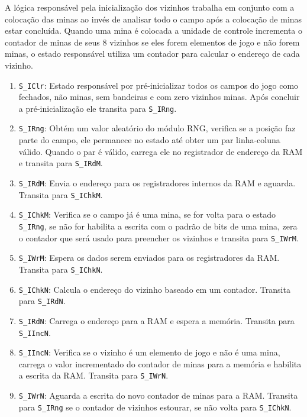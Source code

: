 \documentclass[12pt]{article}
\begin{document}
A lógica responsável pela inicialização dos vizinhos trabalha em conjunto com a
colocação das minas ao invés de analisar todo o campo após a colocação de minas
estar concluída. Quando uma mina é colocada a unidade de controle incrementa
o contador de minas de seus 8 vizinhos se eles forem elementos de jogo e não 
forem minas, o estado responsável utiliza um contador para calcular o endereço
de cada vizinho.

\begin{enumerate}

\item \verb|S_IClr|: Estado responsável por pré-inicializar todos os campos do
	jogo como fechados, não minas, sem bandeiras e com zero vizinhos minas. 
	Após concluir a pré-inicialização ele transita para \verb|S_IRng|.
	
\item \verb|S_IRng|: Obtém um valor aleatório do módulo RNG, verifica se a
	posição faz parte do campo, ele permanece no estado até obter um par
	linha-coluna válido. Quando o par é válido, carrega ele no registrador de
	endereço da RAM e transita para \verb|S_IRdM|.
	
\item \verb|S_IRdM|: Envia o endereço para os registradores internos da RAM e
	aguarda. Transita para \verb|S_IChkM|.
	
\item \verb|S_IChkM|: Verifica se o campo já é uma mina, se for volta para o 
	estado \verb|S_IRng|, se não for habilita a escrita com o padrão de bits
	de uma mina, zera o contador que será usado para preencher os vizinhos e
	transita para \verb|S_IWrM|.
	
\item \verb|S_IWrM|: Espera os dados serem enviados para os registradores da
	RAM. Transita para \verb|S_IChkN|.
	
\item \verb|S_IChkN|: Calcula o endereço do vizinho baseado em um contador.
	Transita para \verb|S_IRdN|.
	
\item \verb|S_IRdN|: Carrega o endereço para a RAM e espera a memória.
	Transita para \verb|S_IIncN|.
	
\item \verb|S_IIncN|: Verifica se o vizinho é um elemento de jogo e não é
	uma mina, carrega o valor incrementado do contador de minas para a 
	memória e habilita a escrita da RAM. Transita para \verb|S_IWrN|.
	
\item \verb|S_IWrN|: Aguarda a escrita do novo contador de minas para a 
	RAM. Transita para \verb|S_IRng| se o contador de vizinhos estourar, 
	se não volta para \verb|S_IChkN|.

\end{enumerate}
\end{document}
